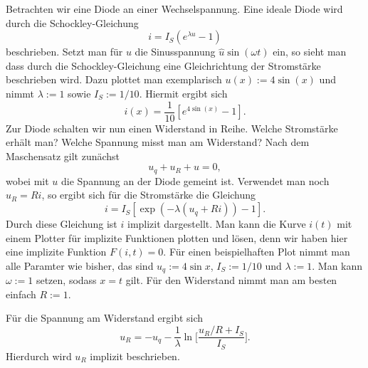 \documentclass[a4paper,10pt,fleqn,twocolumn,twoside]{article}
\numberwithin{equation}{section}
\begin{document}
\noindent
Betrachten wir eine Diode an einer Wechselspannung. Eine ideale
Diode wird durch die Schockley-Gleichung
\begin{equation}
i=I_S(e^{\lambda u}-1)
\end{equation}
beschrieben. Setzt man für $u$ die Sinusspannung
$\hat u\sin(\omega t)$ ein, so sieht man dass durch die
Schockley-Gleichung eine Gleichrichtung der Stromstärke
beschrieben wird. Dazu plottet man exemplarisch
$u(x):=4\sin(x)$ und nimmt $\lambda:=1$ sowie $I_S:=1/10$.
Hiermit ergibt sich
\begin{equation}
i(x)=\frac{1}{10}[e^{4\sin(x)}-1].
\end{equation}
Zur Diode schalten wir nun einen Widerstand in Reihe.
Welche Stromstärke erhält man? Welche Spannung misst man am
Widerstand? Nach dem Maschensatz gilt zunächst
\begin{equation}
u_q+u_R+u=0,
\end{equation}
wobei mit $u$ die Spannung an der Diode gemeint ist.
Verwendet man noch $u_R=Ri$, so ergibt sich
für die Stromstärke die Gleichung
\begin{equation}\label{eq:impliziti}
i=I_S[\exp(-\lambda(u_q+Ri))-1].
\end{equation}
Durch diese Gleichung ist $i$ implizit dargestellt. Man kann
die Kurve $i(t)$ mit einem Plotter für implizite Funktionen
plotten und lösen, denn wir haben hier eine implizite
Funktion $F(i,t)=0$. Für einen
beispielhaften Plot nimmt man alle Paramter wie bisher, das
sind $u_q:=4\sin x$, $I_S:=1/10$ und
$\lambda:=1$. Man kann $\omega:=1$ setzen, sodass $x=t$ gilt.
Für den Widerstand nimmt man am besten einfach $R:=1$.

Für die Spannung am Widerstand ergibt sich
\begin{equation}\label{eq:DiodeuR}
u_R = -u_q -\frac{1}{\lambda}\ln\Big[\frac{u_R/R+I_S}{I_S}\Big].
\end{equation}
Hierdurch wird $u_R$ implizit beschrieben.
\end{document}
